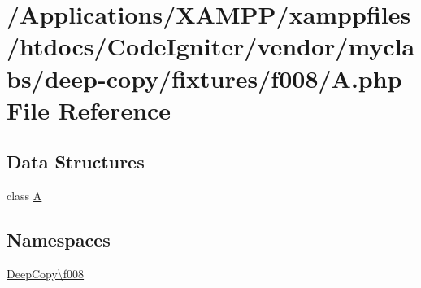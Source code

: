 \hypertarget{f008_2_a_8php}{}\section{/\+Applications/\+X\+A\+M\+P\+P/xamppfiles/htdocs/\+Code\+Igniter/vendor/myclabs/deep-\/copy/fixtures/f008/A.php File Reference}
\label{f008_2_a_8php}
\subsection*{Data Structures}
\begin{DoxyCompactItemize}
\item 
class \mbox{\hyperlink{class_deep_copy_1_1f008_1_1_a}{A}}
\end{DoxyCompactItemize}
\subsection*{Namespaces}
\begin{DoxyCompactItemize}
\item 
 \mbox{\hyperlink{namespace_deep_copy_1_1f008}{Deep\+Copy\textbackslash{}f008}}
\end{DoxyCompactItemize}
